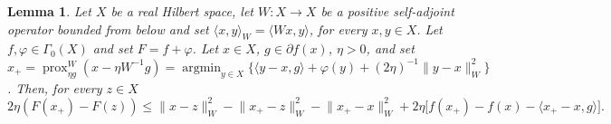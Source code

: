 \documentclass[11pt]{article}
\theoremstyle{plain}
\newtheorem{lemma}[theorem]{Lemma}
\theoremstyle{definition}
\theoremstyle{remark}
\newcommand{\norm}[1]{\lVert{#1}\rVert}
\newcommand{\scalarp}[1]{\langle{#1}\rangle}
\newcommand{\pair}[2]{{\langle{{#1},{#2}}\rangle}}
\DeclareMathOperator*{\argmin}{argmin}
\DeclareMathOperator{\prox}{prox}
\newcommand{\HH}{X}
\newcommand{\R}{\mathbb{R}}
\newcommand{\x}{x}
\newcommand{\y}{y}
\newcommand{\uu}{g}
\newcommand{\reg}{\varphi}
\newcommand{\W}{W}
\begin{document}
\begin{lemma}
\label{lem:basicPGstep}
Let $X$ be a real Hilbert space,
let $\W\colon \HH\to \HH$ be a positive self-adjoint operator bounded from below and set
$\scalarp{\x,\y}_{\W} = \scalarp{\W\x,\y}$, for every $\x,\y\in \HH$.
Let $f,\reg\in \Gamma_0(X)$ and set $F = f+\reg$.
Let $x \in X$, $\uu \in \partial f(x)$, $\eta>0$, and set 
$x_+ = \prox^\W_{\eta g}(x - \eta \W^{-1}\uu) = \argmin_{\y\in \HH} \big\{ \scalarp{\y-\x, \uu} + \reg(\y)+ (2\eta)^{-1}\norm{\y-\x}_{\W}^2 \big\}$. 
Then, for every $z\in \HH$
\begin{equation}
\label{eq:basicPGstep}
2\eta (F(x_+)- F(z)) \leq \norm{x-z}_{\W}^2 - \norm{x_+-z}_{\W}^2 - \norm{x_+-x}_{\W}^2 +2\eta \big[f(x_+)-f(x)- \pair{x_+-x}{\uu}\big].
\end{equation}
\end{lemma}
\end{document}
